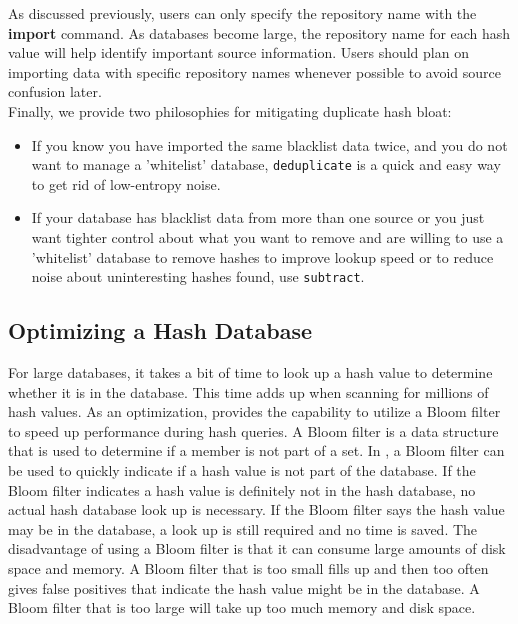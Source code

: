 \documentclass[11pt,fleqn]{article} %
\begin{document}
As discussed previously, users can only specify the repository name with the \textbf{import} command. As databases become large, the repository name for each hash value will help identify important source information. Users should plan on importing data with specific repository names whenever possible to avoid source confusion later.\\

Finally, we provide two philosophies for mitigating duplicate hash bloat:
\begin{itemize}
 \item If you know you have imported the same blacklist data twice,
  and you do not want to manage a 'whitelist' database,
  \texttt{deduplicate} is a quick and easy way to get rid of low-entropy noise.
  \item If your database has blacklist data from more than one source
  or you just want tighter control about what you want to remove
  and are willing to use a 'whitelist' database
  to remove hashes to improve lookup speed
  or to reduce noise about uninteresting hashes found,
  use \texttt{subtract}.
\end{itemize}







\subsection{Optimizing a Hash Database}
\label{optimizing}
 
For large databases, it takes a bit of time to look up a hash value to determine whether it is in the database. This time adds up when scanning for millions of hash values. As an optimization, \hash provides the capability to utilize a Bloom filter to speed up performance during hash queries. A Bloom filter is a data structure that is used to determine if a member is not part of a set. In \hash, a Bloom filter can be used to quickly indicate if a hash value is not part of the database. If the Bloom filter indicates a hash value is definitely not in the hash database, no actual hash database look up is necessary. If the Bloom filter says the hash value may be in the database, a look up is still required and no time is saved. The disadvantage of using a Bloom filter is that it can consume large amounts of disk space and memory. A Bloom filter that is too small fills up and then too often gives false positives that indicate the hash value might be in the database. A Bloom filter that is too large will take up too much memory and disk space.\\
\end{document}
